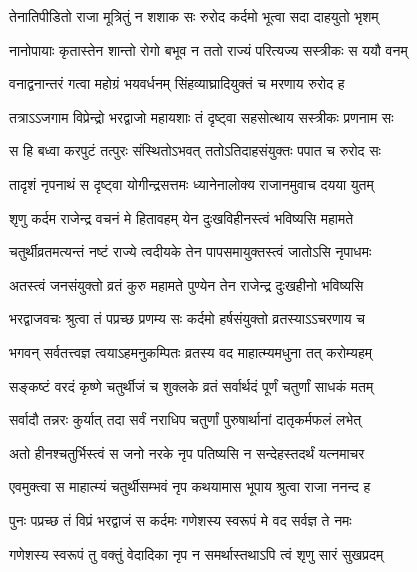 \twolineshloka
{तेनातिपीडितो राजा मूत्रितुं न शशाक सः}
{रुरोद कर्दमो भूत्वा सदा दाहयुतो भृशम्} %

\twolineshloka
{नानोपायाः कृतास्तेन शान्तो रोगो बभूव न}
{ततो राज्यं परित्यज्य सस्त्रीकः स ययौ वनम्} %

\twolineshloka
{वनाद्वनान्तरं गत्वा महोग्रं भयवर्धनम्}
{सिंहव्याघ्रादियुक्तं च मरणाय रुरोद ह} %

\twolineshloka
{तत्राऽऽजगाम विप्रेन्द्रो भरद्वाजो महायशाः}
{तं दृष्ट्वा सहसोत्थाय सस्त्रीकः प्रणनाम सः} %

\twolineshloka
{स हि बध्वा करपुटं तत्पुरः संस्थितोऽभवत्}
{ततोऽतिदाहसंयुक्तः पपात च रुरोद सः} %

\twolineshloka
{तादृशं नृपनाथं स दृष्ट्वा योगीन्द्रसत्तमः}
{ध्यानेनालोक्य राजानमुवाच दयया युतम्} %


\twolineshloka
{श‍ृणु कर्दम राजेन्द्र वचनं मे हितावहम्}
{येन दुःखविहीनस्त्वं भविष्यसि महामते} %

\twolineshloka
{चतुर्थीव्रतमत्यन्तं नष्टं राज्ये त्वदीयके}
{तेन पापसमायुक्तस्त्वं जातोऽसि नृपाधमः} %

\twolineshloka
{अतस्त्वं जनसंयुक्तो व्रतं कुरु महामते}
{पुण्येन तेन राजेन्द्र दुःखहीनो भविष्यसि} %

\twolineshloka
{भरद्वाजवचः श्रुत्वा तं पप्रच्छ प्रणम्य सः}
{कर्दमो हर्षसंयुक्तो व्रतस्याऽऽचरणाय च} %


\twolineshloka
{भगवन् सर्वतत्त्वज्ञ त्वयाऽहमनुकम्पितः}
{व्रतस्य वद माहात्म्यमधुना तत् करोम्यहम्} %


\twolineshloka
{सङ्कष्टं वरदं कृष्णे चतुर्थीजं च शुक्लके}
{व्रतं सर्वार्थदं पूर्णं चतुर्णां साधकं मतम्} %

\twolineshloka
{सर्वादौ तन्नरः कुर्यात् तदा सर्वं नराधिप}
{चतुर्णां पुरुषार्थानां दातृकर्मफलं लभेत्} %

\twolineshloka
{अतो हीनश्चतुर्भिस्त्वं स जनो नरके नृप}
{पतिष्यसि न सन्देहस्तदर्थं यत्नमाचर} %

\twolineshloka
{एवमुक्त्वा स माहात्म्यं चतुर्थीसम्भवं नृप}
{कथयामास भूपाय श्रुत्वा राजा ननन्द ह} %

\twolineshloka
{पुनः पप्रच्छ तं विप्रं भरद्वाजं स कर्दमः}
{गणेशस्य स्वरूपं मे वद सर्वज्ञ ते नमः} %


\twolineshloka
{गणेशस्य स्वरूपं तु वक्तुं वेदादिका नृप}
{न समर्थास्तथाऽपि त्वं श‍ृणु सारं सुखप्रदम्} %

